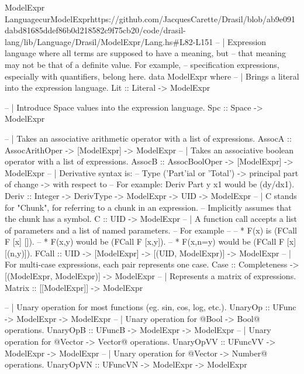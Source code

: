 \begin{haskell}{ModelExpr Language}{curModelExpr}{https://github.com/JacquesCarette/Drasil/blob/ab9e091dabd81685ddef86b0d218582c9f75cb20/code/drasil-lang/lib/Language/Drasil/ModelExpr/Lang.hs\#L82-L151}
-- | Expression language where all terms are supposed to have a meaning, but
--   that meaning may not be that of a definite value. For example,
--   specification expressions, especially with quantifiers, belong here.
data ModelExpr where
  -- | Brings a literal into the expression language.
  Lit       :: Literal -> ModelExpr
  
  -- | Introduce Space values into the expression language.
  Spc       :: Space -> ModelExpr
  
  -- | Takes an associative arithmetic operator with a list of expressions.
  AssocA    :: AssocArithOper -> [ModelExpr] -> ModelExpr
  -- | Takes an associative boolean operator with a list of expressions.
  AssocB    :: AssocBoolOper  -> [ModelExpr] -> ModelExpr
  -- | Derivative syntax is:
  --   Type ('Part'ial or 'Total') -> principal part of change -> with respect to
  --   For example: Deriv Part y x1 would be (dy/dx1).
  Deriv     :: Integer -> DerivType -> ModelExpr -> UID -> ModelExpr
  -- | C stands for "Chunk", for referring to a chunk in an expression.
  --   Implicitly assumes that the chunk has a symbol.
  C         :: UID -> ModelExpr
  -- | A function call accepts a list of parameters and a list of named parameters.
  --   For example
  --
  --   * F(x) is (FCall F [x] []).
  --   * F(x,y) would be (FCall F [x,y]).
  --   * F(x,n=y) would be (FCall F [x] [(n,y)]).
  FCall     :: UID -> [ModelExpr] -> [(UID, ModelExpr)] -> ModelExpr
  -- | For multi-case expressions, each pair represents one case.
  Case      :: Completeness -> [(ModelExpr, ModelExpr)] -> ModelExpr
  -- | Represents a matrix of expressions.
  Matrix    :: [[ModelExpr]] -> ModelExpr
  
  -- | Unary operation for most functions (eg. sin, cos, log, etc.).
  UnaryOp       :: UFunc -> ModelExpr -> ModelExpr
  -- | Unary operation for @Bool -> Bool@ operations.
  UnaryOpB      :: UFuncB -> ModelExpr -> ModelExpr
  -- | Unary operation for @Vector -> Vector@ operations.
  UnaryOpVV     :: UFuncVV -> ModelExpr -> ModelExpr
  -- | Unary operation for @Vector -> Number@ operations.
  UnaryOpVN     :: UFuncVN -> ModelExpr -> ModelExpr
  

\end{haskell}
